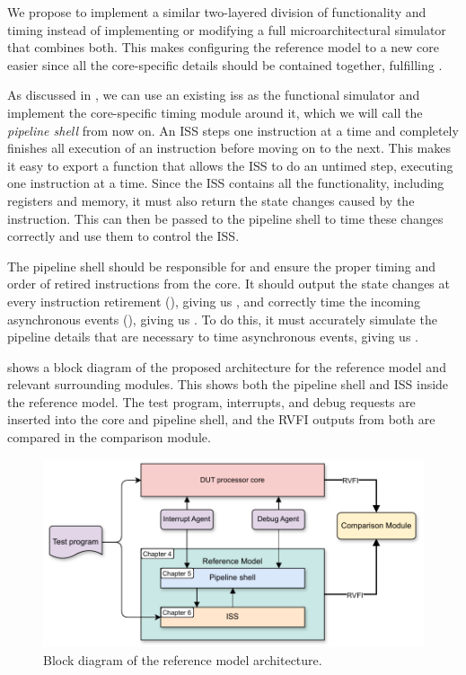 We propose to implement a similar two-layered division of functionality and timing instead of implementing or modifying a full microarchitectural simulator that combines both. This makes configuring the reference model to a new core easier since all the core-specific details should be contained together, fulfilling . 


As discussed in , we can use an existing \acrshort{iss} as the functional simulator and implement the core-specific timing module around it, which we will call the \textit{pipeline shell} from now on. An ISS steps one instruction at a time and completely finishes all execution of an instruction before moving on to the next. This makes it easy to export a  function that allows the ISS to do an untimed step, executing one instruction at a time. Since the ISS contains all the functionality, including registers and memory, it must also return the state changes caused by the instruction. This can then be passed to the pipeline shell to time these changes correctly and use them to control the ISS.

The pipeline shell should be responsible for  and ensure the proper timing and order of retired instructions from the core. It should output the state changes at every instruction retirement (), giving us , and correctly time the incoming asynchronous events (), giving us . To do this, it must accurately simulate the pipeline details that are necessary to time asynchronous events, giving us . 

 shows a block diagram of the proposed architecture for the reference model and relevant surrounding modules. This shows both the pipeline shell and ISS inside the reference model. The test program, interrupts, and debug requests are inserted into the core and pipeline shell, and the RVFI outputs from both are compared in the comparison module.

\begin{figure}
    \centering
    \includegraphics[width=0.75\linewidth]{figures/Architecture.pdf}
    \caption{Block diagram of the reference model architecture.}
    \label{fig:architecture}
\end{figure}


